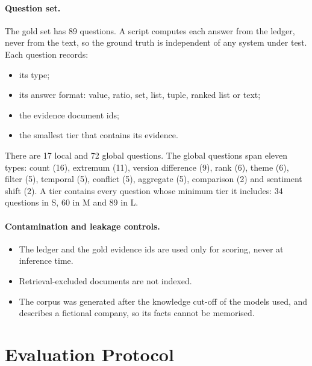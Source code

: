 \documentclass[11pt,letterpaper,oneside]{report}
\begin{document}
\paragraph{Question set.}
The gold set has 89 questions. A script computes each answer from the
ledger, never from the text, so the ground truth is independent of any
system under test. Each question records:
\begin{itemize}
  \item its type;
  \item its answer format: value, ratio, set, list, tuple, ranked list or
  text;
  \item the evidence document ids;
  \item the smallest tier that contains its evidence.
\end{itemize}
There are 17 local and 72 global questions. The global questions span eleven
types: count (16), extremum (11), version difference (9), rank (6), theme
(6), filter (5), temporal (5), conflict (5), aggregate (5), comparison (2)
and sentiment shift (2). A tier contains every question whose minimum tier it
includes: 34 questions in S, 60 in M and 89 in L.

\paragraph{Contamination and leakage controls.}
\begin{itemize}
  \item The ledger and the gold evidence ids are used only for scoring, never
  at inference time.
  \item Retrieval-excluded documents are not indexed.
  \item The corpus was generated after the knowledge cut-off of the models
  used, and describes a fictional company, so its facts cannot be memorised.
\end{itemize}

\section{Evaluation Protocol}
\label{sec:eval}
\end{document}

